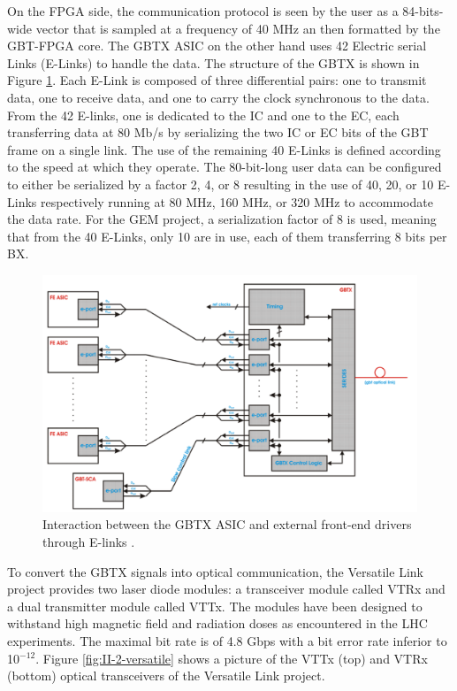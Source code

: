       On the FPGA side, the communication protocol is seen by the user as a 84-bits-wide vector that is sampled at a frequency of 40 MHz an then formatted by the GBT-FPGA core. The GBTX ASIC on the other hand uses 42 Electric serial Links (E-Links) to handle the data. The structure of the GBTX is shown in Figure \ref{fig:II-2-gbt-asic}. Each E-Link is composed of three differential pairs: one to transmit data, one to receive data, and one to carry the clock synchronous to the data. From the 42 E-links, one is dedicated to the IC and one to the EC, each transferring data at 80 Mb/s by serializing the two IC or EC bits of the GBT frame on a single link. The use of the remaining 40 E-Links is defined according to the speed at which they operate. The 80-bit-long user data can be configured to either be serialized by a factor 2, 4, or 8 resulting in the use of 40, 20, or 10 E-Links respectively running at 80 MHz, 160 MHz, or 320 MHz to accommodate the data rate. For the GEM project, a serialization factor of 8 is used, meaning that from the 40 E-Links, only 10 are in use, each of them transferring 8 bits per BX. \\

      \begin{figure}[h!]
        \centering
        \includegraphics[width=\textwidth]{img/II-2-daq/gbt-asic.png}
        \caption{Interaction between the GBTX ASIC and external front-end drivers through E-links \cite{Moreira:1235836}.}
        \label{fig:II-2-gbt-asic}
      \end{figure}

      To convert the GBTX signals into optical communication, the Versatile Link project provides two laser diode modules: a transceiver module called VTRx and a dual transmitter module called VTTx. The modules have been designed to withstand high magnetic field and radiation doses as encountered in the LHC experiments. The maximal bit rate is of 4.8 Gbps with a bit error rate inferior to 10$^{-12}$. Figure \ref{fig:II-2-versatile} shows a picture of the VTTx (top) and VTRx (bottom) optical transceivers of the Versatile Link project.

